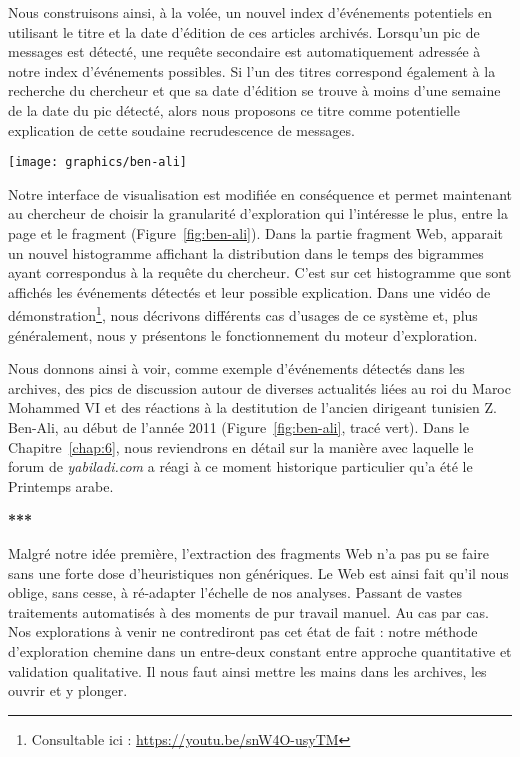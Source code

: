 \documentclass[symmetric,justified,marginals=raggedouter]{tufte-book}
\begin{document}
Nous construisons ainsi, à la volée, un nouvel index d'événements potentiels en utilisant le titre et la date d'édition de ces articles archivés. Lorsqu'un pic de messages est détecté, une requête secondaire est automatiquement adressée à notre index d'événements possibles. Si l'un des titres correspond également à la recherche du chercheur et que sa date d'édition se trouve à moins d'une semaine de la date du pic détecté, alors nous proposons ce titre comme potentielle explication de cette soudaine recrudescence de messages.

\begin{figure*}%
  \texttt{[image: graphics/ben-ali]}
  \caption{Ajout de la détection d'événements à notre interface d'exploration}
  \label{fig:ben-ali}
\end{figure*} 

\noindent Notre interface de visualisation est modifiée en conséquence et permet maintenant au chercheur de choisir la granularité d'explo\-ration qui l'intéresse le plus, entre la page et le fragment (Figure~\ref{fig:ben-ali}). Dans la partie fragment Web, apparait un nouvel histogramme affichant la distribution dans le temps des bigrammes ayant correspondus à la requête du chercheur. C'est sur cet histogramme que sont affichés les événements détectés et leur possible explication. Dans une vidéo de démonstration\footnote{\RaggedOuter Consultable ici : \url{https://youtu.be/snW4O-usyTM}}, nous décrivons différents cas d'usages de ce système et, plus généralement, nous y présentons le fonctionnement du moteur d'exploration. 

Nous donnons ainsi à voir, comme exemple d'événements détectés dans les archives, des pics de discussion autour de diverses actualités liées au roi du Maroc Mohammed VI et des réactions à la destitution de l'ancien dirigeant tunisien Z. Ben-Ali, au début de l'année 2011 (Figure~\ref{fig:ben-ali}, tracé vert). Dans le Chapitre~\ref{chap:6}, nous reviendrons en détail sur la manière avec laquelle le forum de \textit{yabiladi.com} a réagi à ce moment historique particulier qu'a été le Printemps arabe.

\newpage

\begin{center}
	\textbf{***}
\end{center}

\noindent Malgré notre idée première, l'extraction des fragments Web n'a pas pu se faire sans une forte dose d'heuristiques non génériques. Le Web est ainsi fait qu'il nous oblige, sans cesse, à ré-adapter l'échelle de nos analyses. Passant de vastes traitements automatisés à des moments de pur travail manuel. Au cas par cas. Nos explorations à venir ne contrediront pas cet état de fait : notre méthode d'exploration chemine dans un entre-deux constant entre approche quantitative et validation qualitative. Il nous faut ainsi mettre les mains dans les archives, les ouvrir et y plonger.
\end{document}
